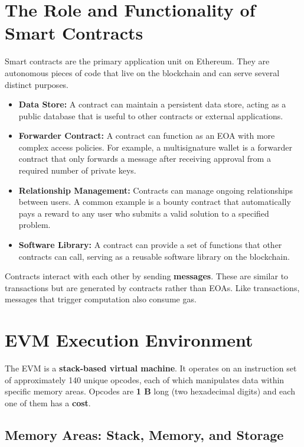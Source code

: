 \documentclass{scrbook}
\begin{document}
\section{The Role and Functionality of Smart Contracts}

Smart contracts are the primary application unit on Ethereum. They are autonomous pieces of code that live on the blockchain and can serve several distinct purposes.

\begin{itemize}
    \item \textbf{Data Store:} A contract can maintain a persistent data store, acting as a public database that is useful to other contracts or external applications.
    
    \item \textbf{Forwarder Contract:} A contract can function as an EOA with more complex access policies. For example, a multisignature wallet is a forwarder contract that only forwards a message after receiving approval from a required number of private keys.
    
    \item \textbf{Relationship Management:} Contracts can manage ongoing relationships between users. A common example is a bounty contract that automatically pays a reward to any user who submits a valid solution to a specified problem.
    
    \item \textbf{Software Library:} A contract can provide a set of functions that other contracts can call, serving as a reusable software library on the blockchain.
\end{itemize}

Contracts interact with each other by sending \textbf{messages}. These are similar to transactions but are generated by contracts rather than EOAs. Like transactions, messages that trigger computation also consume gas.

\section{EVM Execution Environment}

The EVM is a \textbf{stack-based virtual machine}. It operates on an instruction set of approximately 140 unique opcodes, each of which manipulates data within specific memory areas. Opcodes are \textbf{1 B} long (two hexadecimal digits) and each one of them has a \textbf{cost}.

\subsection{Memory Areas: Stack, Memory, and Storage}
\end{document}
